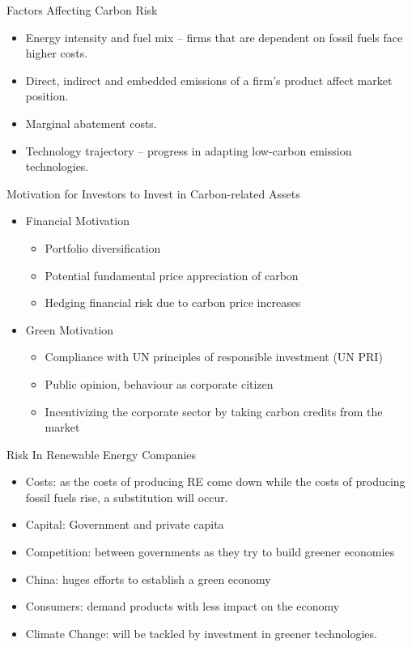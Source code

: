 {Factors Affecting Carbon Risk}
\begin{itemize}
\item<1-> Energy intensity and fuel mix -- firms that are dependent on fossil fuels face higher costs.
\item<2-> Direct, indirect and embedded emissions of a firm's product affect market position.
\item<3-> Marginal abatement costs.
\item<4-> Technology trajectory -- progress in adapting low-carbon emission technologies.
\end{itemize}



{Motivation for Investors to Invest in Carbon-related Assets}
\begin{itemize}
\item<1-> Financial Motivation
\begin{itemize}
\item Portfolio diversification
\item Potential fundamental price appreciation of carbon
\item Hedging financial risk due to carbon price increases
\end{itemize}
\item<2-> Green Motivation
\begin{itemize}
\item Compliance with UN principles of responsible investment (UN PRI)
\item Public opinion, behaviour as corporate citizen
\item Incentivizing the corporate sector by taking carbon credits from the market
\end{itemize}
\end{itemize}



{Risk In Renewable Energy Companies}
\begin{itemize}
\item<1-> Costs: as the costs of producing RE come down while the costs of producing fossil fuels rise, a
substitution will occur.
\item<2-> Capital: Government and private capita
\item<3-> Competition: between governments as they try to build greener economies
\item<4-> China: huges efforts to establish a green economy
\item<5-> Consumers: demand products with less impact on the economy
\item<6-> Climate Change: will be tackled by investment in greener technologies.
\end{itemize}



